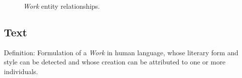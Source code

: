 \begin{figure}[ht]
    \begin{center}
        
    \end{center}
\label{fig:WorkER}
\caption{\textit{Work} entity relationships.}
\end{figure}


\subsection{Text}

Definition: Formulation of a \textit{Work} in human language, whose literary form and style can be detected and whose creation can be attributed to one or more individuals.

